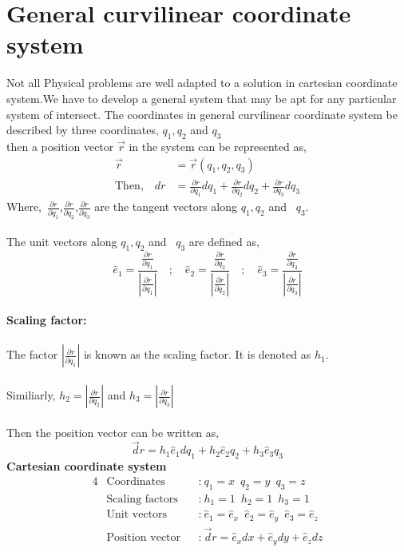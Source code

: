 \section{General curvilinear coordinate system}
Not all Physical problems  are well adapted to a solution in cartesian coordinate system.We have to develop a general system that may be apt for any particular system of intersect.
The coordinates in general curvilinear coordinate system be described by three coordinates, $q_{1},q_{2} $ and $ q_{3}$\\then  a position vector $ \vec{ r}$ in the system can be represented as,
\begin{align*}
\vec{r}&=\vec{r}(q_{1},q_{2},q_{3})\\
\text{Then,}\quad
 dr&={\frac{\partial r}{\partial q_{1} }} dq_{1}+{\frac{\partial r}{\partial q_{2} }} dq_{2}+{\frac{\partial r}{\partial q_{3} }} dq_{3}
\end{align*}
Where,\ ${\frac{\partial r}{\partial q_{1} }}$,${\frac{\partial r}{\partial q_{2} }}$,${\frac{\partial r}{\partial q_{3} }}$ are the tangent vectors along $q_{1},q_{2}  $ and \ $q_{3}$.
\\\\The unit vectors along $q_{1},q_{2}  $ and \ $q_{3}$ are defined as,
$$ \hat e_{1}=\frac{{\frac{\partial r}{\partial q_{1} }}}{|{\frac{\partial r}{\partial q_{1} }}|}\quad ;\quad
 \hat e_{2}=\frac{{\frac{\partial r}{\partial q_{2} }}}{|{\frac{\partial r}{\partial q_{2} }}|}\quad ;\quad\hat e_{3}=\frac{{\frac{\partial r}{\partial q_{3} }}}{|{\frac{\partial r}{\partial q_{3} }}|}$$
\\
\textbf{Scaling factor:}\\\\
The factor ${|{\frac{\partial r}{\partial q_{1} }}|}$ is known as the scaling factor. It is denoted as $h_{1}$.\\\\
Similiarly, $h_{2}={|{\frac{\partial r}{\partial q_{2} }}|}$
and $h_{3}={|{\frac{\partial r}{\partial q_{3} }}|}$\\
\\Then the position vector can be written as,
\begin{equation}
\vec dr=h_{1}\hat e_{1} dq_{1}+h_{2}\hat e_{2} q_{2}+h_{3}\hat e_{3}q_{3}
\end{equation}
\textbf{Cartesian coordinate system}
\begin{alignat*}{4}
&\text{Coordinates}&& \textbf{:} \ q_{1}=x\;\ q_{2}=y\;\ q_{3}=z\\
&\text{Scaling factors} && \textbf{:}\ h_{1}=1\; \ h_{2}=1\;\  h_{3}=1\\
&\text{Unit vectors}&&\textbf{:}\ \hat{e}_{1}=\hat{e}_{x}\;\ \hat{e}_{2}=\hat{e}_{y}\;\ \hat{e}_{3}=\hat{e}_{z}\\
&\text{Position vector}&&\textbf{:} \ \vec dr=\hat e_{x} dx+\hat e_{y} dy+\hat e_{z}dz
\end{alignat*}

